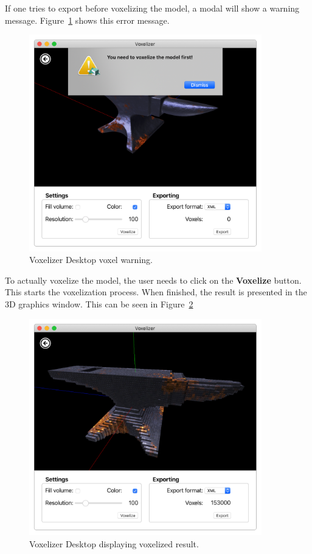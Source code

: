 If one tries to export before voxelizing the model, a modal will show a warning message. Figure~\ref{fig:voxelizer-desktop-gui-main-voxel-warning} shows this error message.
\begin{figure}[htp]
    \centering
    \includegraphics[width=0.9\textwidth]{sections/result/figures/voxelizer-desktop-gui-main-voxel-warning.png}
    \caption{Voxelizer Desktop voxel warning.}
    \label{fig:voxelizer-desktop-gui-main-voxel-warning}
\end{figure}
\clearpage

To actually voxelize the model, the user needs to click on the \textbf{Voxelize} button. This starts the voxelization process. When finished, the result is presented in the 3D graphics window. This can be seen in Figure~\ref{fig:voxelizer-desktop-gui-voxels}
\begin{figure}[htp]
    \centering
    \includegraphics[width=0.9\textwidth]{sections/result/figures/voxelizer-desktop-gui-voxels.png}
    \caption{Voxelizer Desktop displaying voxelized result.}
    \label{fig:voxelizer-desktop-gui-voxels}
\end{figure}
\clearpage

